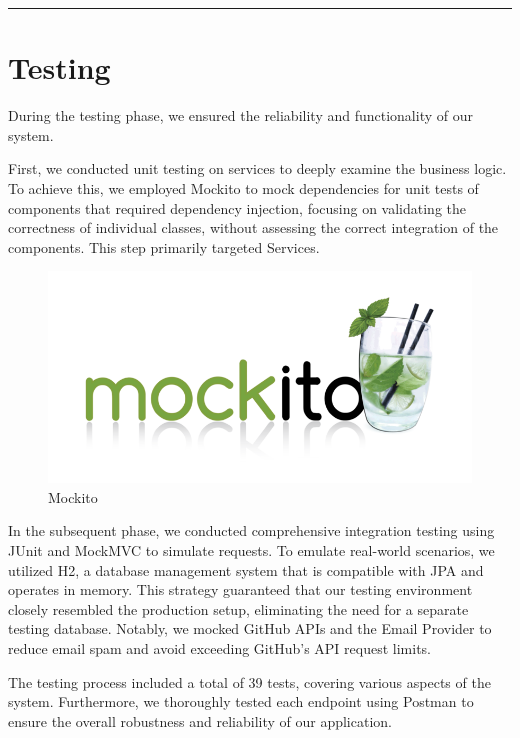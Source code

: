 \documentclass{Configuration_Files/Template}
\begin{document}
{\color{bluepoli}\rule{\linewidth}{0.1pt}}

\chapter{Testing}

During the testing phase, we ensured the reliability and functionality of our system.

First, we conducted unit testing on services to deeply examine the business logic. To achieve this, we employed Mockito to mock dependencies for unit tests of components that required dependency injection, focusing on validating the correctness of individual classes, without assessing the correct integration of the components. This step primarily targeted Services.

\begin{figure}[h]
    \centering
    \includegraphics[scale = 0.25]{ITD_latex/Images/Test/mockito.png}
    \caption{Mockito}
\end{figure}

In the subsequent phase, we conducted comprehensive integration testing using JUnit and MockMVC to simulate requests. To emulate real-world scenarios, we utilized H2, a database management system that is compatible with JPA and operates in memory. This strategy guaranteed that our testing environment closely resembled the production setup, eliminating the need for a separate testing database. Notably, we mocked GitHub APIs and the Email Provider to reduce email spam and avoid exceeding GitHub's API request limits.

The testing process included a total of 39 tests, covering various aspects of the system. Furthermore, we thoroughly tested each endpoint using Postman to ensure the overall robustness and reliability of our application.
\end{document}
